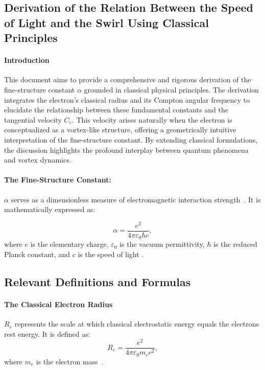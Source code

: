 
\subsection{Derivation of the Relation Between the Speed of Light and the Swirl Using Classical Principles}\label{subsec:derivation-of-the-relation-between-the-speed-of-light-and-the-swirl-using-classical-principles}

\paragraph*{Introduction}
    This document aims to provide a comprehensive and rigorous derivation of the fine-structure constant $\alpha$ grounded in classical physical principles.
    The derivation integrates the electron's classical radius and its Compton angular frequency to elucidate the relationship between these fundamental constants and the tangential velocity $C_e$.
    This velocity arises naturally when the electron is conceptualized as a vortex-like structure, offering a geometrically intuitive interpretation of the fine-structure constant.
    By extending classical formulations, the discussion highlights the profound interplay between quantum phenomena and vortex dynamics.


\paragraph*{The Fine-Structure Constant:}
 $\alpha$ serves as a dimensionless measure of electromagnetic interaction strength~\cite{maxwell1861}.
It is mathematically expressed as:

\begin{equation*}
    \alpha = \frac{e^2}{4\pi \varepsilon_0 \hbar c},
\end{equation*}
where $e$ is the elementary charge, $\varepsilon_0$ is the vacuum permittivity, $\hbar$ is the reduced Planck constant, and $c$ is the speed of light \cite{dirac1930quantum}.

\subsection*{Relevant Definitions and Formulas}
\paragraph*{The Classical Electron Radius}
$R_e$ represents the scale at which classical electrostatic energy equals the electron\rqs s rest energy. It is defined as:
\begin{equation*}
    R_e = \frac{e^2}{4\pi \varepsilon_0 m_e c^2},
\end{equation*}
where $m_e$ is the electron mass~\cite{helmholtz1858}.

